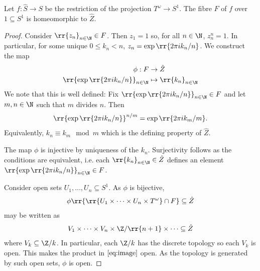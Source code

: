 \documentclass{article}
\begin{document}
\begin{claim*}
  Let $f:\hat S\to S$ be the restriction of the projection $T^\omega\to S^1$.
  The fibre $F$ of $f$ over $1\subseteq S^1$ is homeomorphic to $\hat Z$.
  \begin{proof}
    Consider $\rr{z_n}_{n\in\N}\in F$. Then $z_1=1$ so, for all $n\in\N$,
    $z_n^n=1$. In particular, for some unique $0\leq k_n<n$, $z_n=\exp\rr{2\pi ik_n/n}$.
    We construct the map
    \begin{align*}
      \phi : F &\to \hat Z\\
      \rr{\exp\rr{2\pi ik_n/n}}_{n\in\N} &\mapsto \rr{k_n}_{n\in\N}
    \end{align*}
    We note that this is well defined: Fix $\rr{\exp\rr{2\pi ik_n/n}}_{n\in\N}\in F$ and
    let $m,n\in\N$ such that $m$ divides $n$. Then
    \begin{align*}
      \rr{\exp\rr{2\pi i k_n/n}}^{n/m} = \exp\rr{2\pi i k_m/m}.
    \end{align*}
    Equivalently, $k_n\equiv k_m\mod m$ which is the defining property of $\hat Z$.

    The map $\phi$ is injective by uniqueness of the $k_n$. Surjectivity follows as
    the conditions are equivalent, i.e. each $\rr{k_n}_{n\in\N}\in\hat Z$ defines an element
    $\rr{\exp\rr{2\pi i k_n/n}}_{n\in\N}\in F$.

    Consider open sets $U_1,\ldots,U_n\subseteq S^1$. As $\phi$ is bijective,
    \begin{align}
      \label{eq:image}
      \phi\rr{\rr{U_1\times\cdots\times U_n\times T^\omega}\cap F} \subseteq \hat Z
    \end{align}
    may be written as
    \begin{align*}
      V_1\times\cdots\times V_n\times \Z/\rr{n+1}\times\cdots\subseteq\hat Z
    \end{align*}
    where $V_k\subseteq \Z/k$. In particular, each $\Z/k$ has the discrete topology so
    each $V_k$ is open. This makes the product in $\ref{eq:image}$ open. As the topology is
    generated by such open sets, $\phi$ is open.


\end{proof}
\end{claim*}
\end{document}
